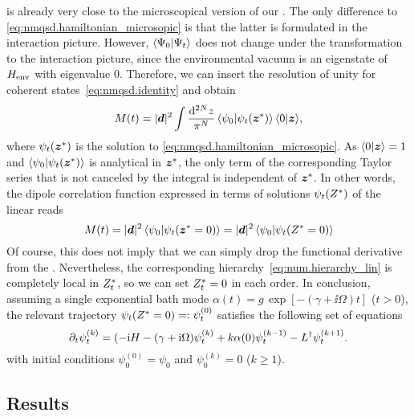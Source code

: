  is already very close to the microscopical version of our {\NMSSE}.
The only difference to \autoref{eq:nmqsd.hamiltonian_microsopic} is that the latter is formulated in the interaction picture.
However, $\langle \Psi_0 | \Psi_t \rangle$ does not change under the transformation to the interaction picture, since the environmental vacuum is an eigenstate of $H_\mathrm{env}$ with eigenvalue $0$.
Therefore, we can insert the resolution of unity for coherent states~\ref{eq:nmqsd.identity} and obtain
\begin{equation*}
  M(t) = \abs{\vec d}^2 \int \frac{\mathrm{d}^{2N}z}{\pi^N} \, \braket{\psi_0}{\psitz} \, \braket{0}{\zz},
\end{equation*}
where $\psitz$ is the solution to \autoref{eq:nmqsd.hamiltonian_microsopic}.
As $\langle 0 | \boldsymbol{z} \rangle = 1$ and $\langle \psi_0 | \psi_t({\boldsymbol{z}}^*) \rangle$ is analytical in ${\boldsymbol{z}}^*$, the only term of the corresponding Taylor series that is not canceled by the integral is independent of ${\boldsymbol{z}}^*$.
In other words, the dipole correlation function expressed in terms of solutions $\psitZ$ of the linear \NMSSE reads
\begin{equation}
  M(t) = \vert \boldsymbol{d} \vert^2 \, \langle \psi_0 | \psi_t({\boldsymbol{z}}^* = 0) \rangle = \vert \boldsymbol{d} \vert^2 \, \langle \psi_0 | \psi_t({Z}^* = 0) \rangle
  \label{eq:app.dipole_correlation_nmsse}
\end{equation}
Of course, this does not imply that we can simply drop the functional derivative from the {\NMSSE}.
Nevertheless, the corresponding hierarchy~\ref{eq:num.hierarchy_lin} is completely local in ${Z}^*_t$, so we can set ${Z}^*_t = 0$ in each order.
In conclusion, assuming a single exponential bath mode $\alpha(t) = g\,\exp[-(\gamma + \ii\Omega) t]$ ($t > 0$), the relevant trajectory $\psi_t(\ZZ = 0) =: \psit[0]$ satisfies the following set of equations
\begin{equation}
  \partial_t\psit[k] = (-\ii\Hsys - (\gamma + \ii\Omega)\psit[k] + k \alpha(0) \psit[k-1] - \adj{L} \psit[k+1].
  \label{eq:app.spectrum_hierarchy}
\end{equation}
with initial conditions $\psi_0^{(0)} = \psi_0$ and $\psi_0^{(k)} = 0$ ($k \ge 1$).

\subsection{Results}
\label{sub:app.spectra.results}

